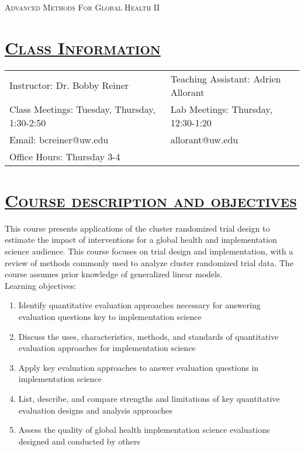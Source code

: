 \documentclass[fancyhdr,10pt]{article}
\renewcommand{\arraystretch}{1.4}
\begin{document}
\hbox{}\vspace{-.6in}
\begin{center}
\LARGE\textsc{Advanced Methods For Global Health II}
\end{center}


\section*{\underline{\textsc{Class Information}}}


  \begin{tabular}{m{3.5in} m{4.5in}}
Instructor: Dr. Bobby Reiner & Teaching Assistant: Adrien Allorant\\
Class Meetings: Tuesday, Thursday, 1:30-2:50 & Lab Meetings: Thursday, 12:30-1:20\\
Email: bcreiner@uw.edu & allorant@uw.edu\\
Office Hours: Thursday 3-4\\
\end{tabular}

\renewcommand{\arraystretch}{1.2}
\section*{\underline{\textsc{Course description and objectives}}}
This course presents applications of the cluster randomized trial design to estimate the impact of interventions for a global health and implementation science audience. This course focuses on trial design and implementation, with a review of methods commonly used to analyze cluster randomized trial data.  The course assumes prior knowledge of generalized linear models.\\

\noindent Learning objectives:\\
\begin{enumerate}
 \item Identify quantitative evaluation approaches necessary for answering evaluation questions key to implementation science
 \item Discuss the uses, characteristics, methods, and standards of quantitative evaluation approaches for implementation science
 \item Apply key evaluation approaches to answer evaluation questions in implementation science
 \item List, describe, and compare strengths and limitations of key quantitative evaluation designs and analysis approaches
 \item Assess the quality of global health implementation science evaluations designed and conducted by others
\end{enumerate}
\end{document}
